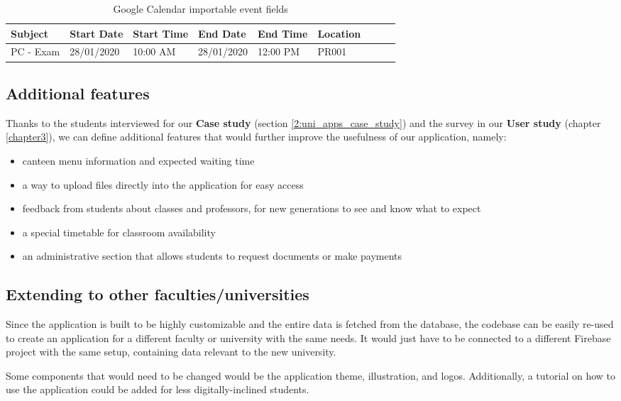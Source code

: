     \begin{table}[th]\small\linespread{1}
        \centering
        \caption{Google Calendar importable event fields}
        \label{6:tab:event_format}
        \begin{tabular}{| l | l | l | l | l | l | l | l | l |}
        \hline
        \textbf{Subject} & \textbf{Start Date} & \textbf{Start Time} & \textbf{End Date} & \textbf{End Time} & \textbf{Location}
        \\
        \hline
        PC - Exam & 28/01/2020 & 10:00 AM & 28/01/2020 & 12:00 PM & PR001
        \\
        \hline
        \end{tabular}
    \end{table}
    
    \subsection{Additional features} \label{6:future_features}
    
    Thanks to the students interviewed for our \textbf{Case study} (section \ref{2:uni_apps_case_study}) and the survey in our \textbf{User study} (chapter \ref{chapter3}), we can define additional features that would further improve the usefulness of our application, namely:
    \begin{itemize}
        \setlength{\topsep}{0.5pt}
        \setlength{\itemsep}{0.5pt}
        \setlength{\parsep}{0.5pt}
        \item canteen menu information and expected waiting time
        \item a way to upload files directly into the application for easy access
        \item feedback from students about classes and professors, for new generations to see and know what to expect
        \item a special timetable for classroom availability
        \item an administrative section that allows students to request documents or make payments
    \end{itemize}
    
    \subsection{Extending to other faculties/universities} \label{6:future_extending}
    Since the application is built to be highly customizable and the entire data is fetched from the database, the codebase can be easily re-used to create an application for a different faculty or university with the same needs. It would just have to be connected to a different Firebase project with the same setup, containing data relevant to the new university.
    
    Some components that would need to be changed would be the application theme, illustration, and logos. Additionally, a tutorial on how to use the application could be added for less digitally-inclined students.